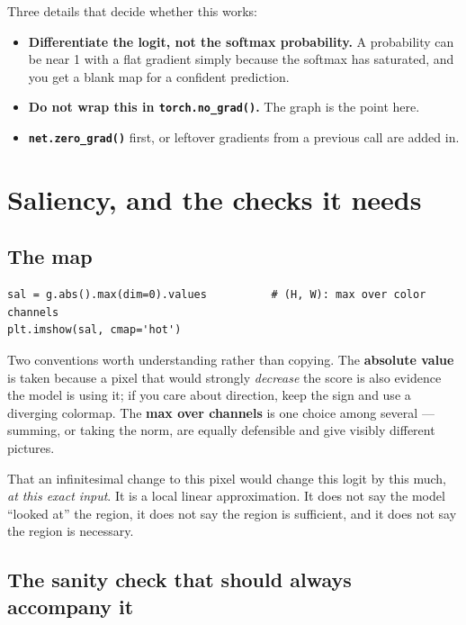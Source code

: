 \documentclass[11pt]{article}
\begin{document}
Three details that decide whether this works:

\begin{itemize}
  \item \textbf{Differentiate the logit, not the softmax probability.} A
        probability can be near 1 with a flat gradient simply because the
        softmax has saturated, and you get a blank map for a confident
        prediction.
  \item \textbf{Do not wrap this in \texttt{torch.no\_grad()}.} The graph is the
        point here.
  \item \textbf{\texttt{net.zero\_grad()}} first, or leftover gradients from a
        previous call are added in.
\end{itemize}

\section{Saliency, and the checks it needs}

\subsection{The map}

\begin{lstlisting}
sal = g.abs().max(dim=0).values          # (H, W): max over color channels
plt.imshow(sal, cmap='hot')
\end{lstlisting}

Two conventions worth understanding rather than copying. The \textbf{absolute
value} is taken because a pixel that would strongly \emph{decrease} the score is
also evidence the model is using it; if you care about direction, keep the sign
and use a diverging colormap. The \textbf{max over channels} is one choice among
several --- summing, or taking the norm, are equally defensible and give visibly
different pictures.

\begin{keybox}
 That an infinitesimal change to this
pixel would change this logit by this much, \emph{at this exact input}. It is a
local linear approximation. It does not say the model ``looked at'' the region,
it does not say the region is sufficient, and it does not say the region is
necessary.
\end{keybox}

\subsection{The sanity check that should always accompany it}
\end{document}
